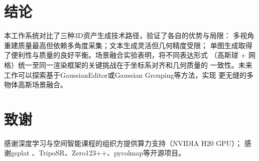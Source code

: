 \documentclass{article}
\begin{document}
\section{结论}
\label{sec:conclusion}

本工作系统对比了三种3D资产生成技术路径，验证了各自的优势与局限：
多视角重建质量最高但依赖多角度采集；文本生成灵活但几何精度受限；
单图生成取得了便利性与质量的良好平衡。场景融合实验表明，将不同表达形式
（高斯球 + 网格）统一至同一渲染框架的关键挑战在于坐标系对齐和几何质量的
一致性。未来工作可以探索基于GaussianEditor或Gaussian Grouping等方法，实现
更无缝的多物体高斯场景融合。

\section*{致谢}

感谢深度学习与空间智能课程的组织方提供算力支持（NVIDIA H20 GPU）；
感谢gsplat \cite{ye2024gsplat}、TripoSR、Zero123++、pycolmap等开源项目。
\end{document}
